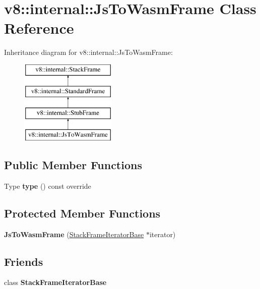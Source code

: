 \hypertarget{classv8_1_1internal_1_1JsToWasmFrame}{}\section{v8\+:\+:internal\+:\+:Js\+To\+Wasm\+Frame Class Reference}
\label{classv8_1_1internal_1_1JsToWasmFrame}
Inheritance diagram for v8\+:\+:internal\+:\+:Js\+To\+Wasm\+Frame\+:\begin{figure}[H]
\begin{center}
\leavevmode
\includegraphics[height=4.000000cm]{classv8_1_1internal_1_1JsToWasmFrame}
\end{center}
\end{figure}
\subsection*{Public Member Functions}
\begin{DoxyCompactItemize}
\item 
\mbox{\label{classv8_1_1internal_1_1JsToWasmFrame_af15d3ade162d7dfa71aa4a3cd7267cb1}} 
Type {\bfseries type} () const override
\end{DoxyCompactItemize}
\subsection*{Protected Member Functions}
\begin{DoxyCompactItemize}
\item 
\mbox{\label{classv8_1_1internal_1_1JsToWasmFrame_a9a47ff06e9a11931cf7bb16cdb3e119f}} 
{\bfseries Js\+To\+Wasm\+Frame} (\mbox{\hyperlink{classv8_1_1internal_1_1StackFrameIteratorBase}{Stack\+Frame\+Iterator\+Base}} $\ast$iterator)
\end{DoxyCompactItemize}
\subsection*{Friends}
\begin{DoxyCompactItemize}
\item 
\mbox{\label{classv8_1_1internal_1_1JsToWasmFrame_ac7310421866976ca454bbe11c5f926c3}} 
class {\bfseries Stack\+Frame\+Iterator\+Base}
\end{DoxyCompactItemize}

